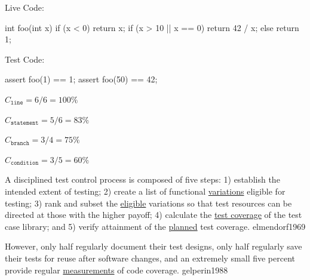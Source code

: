 \documentclass{article}
\begin{document}
\begin{multicols}{2}
Live Code:\par
{\small\begin{ffcode}
int foo(int x) {
  if (x < 0) { return x; }
  if (x > 10 || x == 0) {
    return 42 / x;
  } else {
    return 1;
  }
}
\end{ffcode}
}
\par\columnbreak\par
Test Code:\par
{\small\begin{ffcode}
assert foo(1) == 1;
assert foo(50) == 42;
\end{ffcode}
}
\( C_{\texttt{line}} = 6/6 = 100\% \)\par
\( C_{\texttt{statement}} = 5/6 = 83\% \)\par
\( C_{\texttt{branch}} = 3/4 = 75\% \)\par
\( C_{\texttt{condition}} = 3/5 = 60\% \)\par
\end{multicols}
\plush{}

  {A disciplined test control process is composed of five steps: 1) establish the intended extent of testing; 2) create a list of functional \ul{variations} eligible for testing; 3) rank and subset the \ul{eligible} variations so that test resources can be directed at those with the higher payoff; 4) calculate the \ul{test coverage} of the test case library; and 5) verify attainment of the \ul{planned} test coverage.}
  {elmendorf1969}

  {However, only half regularly document their test designs, only half regularly save their tests for reuse after software changes, and an extremely small five percent provide regular \ul{measurements} of code coverage.}
  {gelperin1988}
\end{document}
